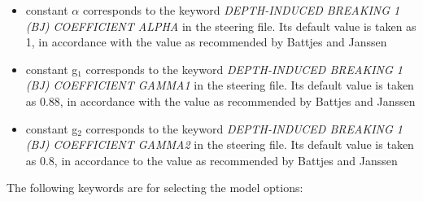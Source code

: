 \begin{itemize}
\item  constant $\alpha$ corresponds to the keyword \textit{DEPTH-INDUCED BREAKING 1 (BJ) COEFFICIENT ALPHA} in the steering file. Its default value is taken as 1, in accordance with the value as recommended by Battjes and Janssen \cite{Battjes1978}
\item  constant g${}_{1}$ corresponds to the keyword \textit{DEPTH-INDUCED BREAKING 1 (BJ) COEFFICIENT GAMMA1} in the steering file. Its default value is taken as 0.88, in accordance with the value as recommended by Battjes and Janssen \cite{Battjes1978}
\item  constant g${}_{2}$ corresponds to the keyword \textit{DEPTH-INDUCED BREAKING 1 (BJ) COEFFICIENT GAMMA2} in the steering file. Its default value is taken as 0.8, in accordance to the value as recommended by Battjes and Janssen \cite{Battjes1978}
\end{itemize}

 The following keywords are for selecting the model options:

